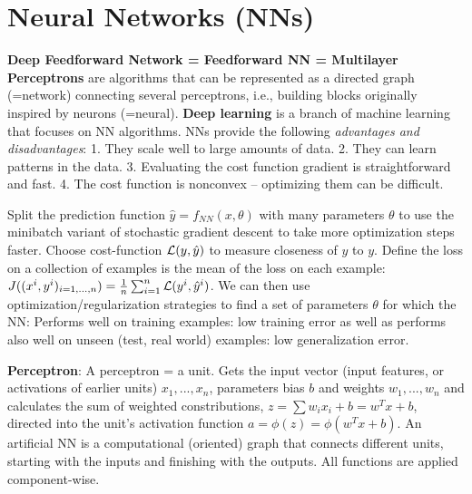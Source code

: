 \section*{Neural Networks (NNs)}
\textbf{Deep Feedforward Network = Feedforward NN = Multilayer Perceptrons} are algorithms that can be represented as a directed graph (=network) connecting several perceptrons, i.e., building blocks originally inspired by neurons (=neural).
\textbf{Deep learning} is a branch of machine learning that focuses on NN algorithms.
NNs provide the following \textit{advantages and disadvantages}: 
1. They scale well to large amounts of data.
2. They can learn patterns in the data.
3. Evaluating the cost function gradient is straightforward and fast.
4. The cost function is nonconvex – optimizing them can be difficult.

Split the prediction function $\hat{y}=f_{NN} (x,\theta)$ with many parameters $\theta$ to use the minibatch variant of stochastic gradient descent to take more optimization steps faster.
Choose cost-function $\mathcal{L}(y,\hat{y})$ to measure closeness of $\hat{y}$ to $y$. 
Define the loss on a collection of examples is the mean of the loss on each example: $J((x^i, y^i)_{i=1,...,n})=\frac{1}{n} \sum_{i=1}^n \mathcal{L}(y^i, \hat{y}^i)$.
We can then use optimization/regularization strategies to find a set of parameters $\theta$ for which the NN: Performs well on training examples: low training error as well as performs also well on unseen (test, real world) examples: low generalization error.

\textbf{Perceptron}: A perceptron = a unit. Gets the input vector (input features, or activations of earlier units) $x_1,...,x_n$, parameters bias $b$ and weights $w_1,...,w_n$ and calculates the sum of weighted constributions, $z=\sum w_i x_i + b = w^T x + b$, directed into the unit's activation function $a = \phi (z) = \phi (w^T x + b)$.
An artificial NN is a computational (oriented) graph that connects different units, starting with the inputs and finishing with the outputs.
All functions are applied component-wise.

